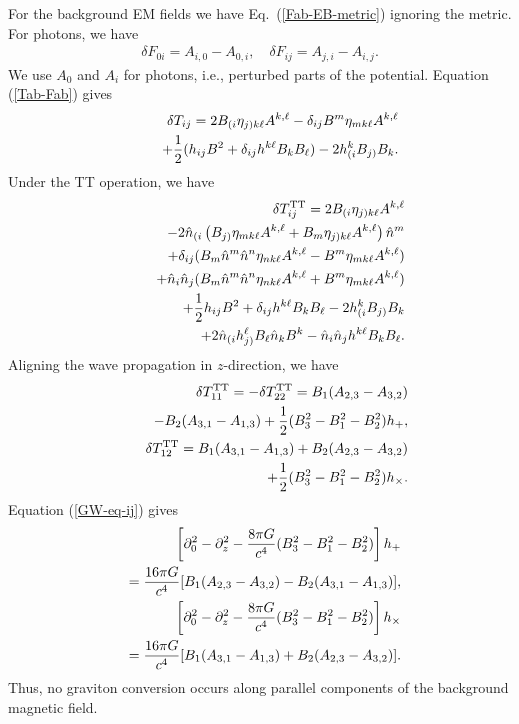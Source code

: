 \documentclass[twocolumn,amsmath,amssymb]{revtex4}
\newcommand{\bea}{\begin{eqnarray}}
\newcommand{\eea}{\end{eqnarray}}
\begin{document}
For the background EM fields we have Eq.\ (\ref{Fab-EB-metric}) ignoring the metric. For photons, we have
\bea
   \delta F_{0i} = A_{i,0} - A_{0,i}, \quad
       \delta F_{ij} = A_{j,i} - A_{i,j}.
   \label{Fab-EB-no-metric}
\eea
We use $A_0$ and $A_i$ for photons, i.e., perturbed parts of the potential. Equation (\ref{Tab-Fab}) gives
\bea
   & & \delta T_{ij} = 2 B_{(i} \eta_{j)k\ell} A^{k,\ell}
       - \delta_{ij} B^m \eta_{mk\ell} A^{k,\ell}
   \nonumber \\
   & & \qquad
       + {1 \over 2} ( h_{ij} B^2
       + \delta_{ij} h^{k\ell} B_k B_\ell )
       - 2 h^k_{(i} B_{j)} B_k.
\eea
Under the TT operation, we have
\bea
   & & \delta T_{ij}^{\rm TT}
       = 2 B_{(i} \eta_{j)k\ell} A^{k,\ell}
   \nonumber \\
   & & \qquad
       - 2 \hat n_{(i} \left( B_{j)} \eta_{mk\ell} A^{k,\ell}
       + B_m \eta_{j)k\ell} A^{k,\ell} \right) \hat n^m
   \nonumber \\
   & & \qquad
       + \delta_{ij}
       (B_m \hat n^m \hat n^n \eta_{nk\ell} A^{k,\ell}
       - B^m \eta_{mk\ell} A^{k,\ell} )
   \nonumber \\
   & & \qquad
       + \hat n_i \hat n_j
       (B_m \hat n^m \hat n^n \eta_{nk\ell} A^{k,\ell}
       + B^m \eta_{mk\ell} A^{k,\ell} )
   \nonumber \\
   & & \qquad
       + {1 \over 2} h_{ij} B^2
       + \delta_{ij} h^{k\ell} B_k B_\ell
       - 2 h^k_{(i} B_{j)} B_k
   \nonumber \\
   & & \qquad
       + 2 \hat n_{(i} h^\ell_{j)} B_\ell \hat n_k B^k
       - \hat n_i \hat n_j h^{k\ell} B_k B_\ell.
\eea
Aligning the wave propagation in $z$-direction, we have
\bea
   & & \delta T_{11}^{\rm TT}
       = - \delta T_{22}^{\rm TT}
       = B_1 ( A_{2,3} - A_{3,2} )
   \nonumber \\
   & & \qquad
       - B_2 ( A_{3,1} - A_{1,3} )
       + {1 \over 2} ( B_3^2 - B_1^2 - B_2^2 ) h_+,
   \nonumber \\
   & & \delta T_{12}^{\rm TT}
       = B_1 ( A_{3,1} - A_{1,3} )
       + B_2 ( A_{2,3} - A_{3,2} )
   \nonumber \\
   & & \qquad
       + {1 \over 2} ( B_3^2 - B_1^2 - B_2^2 ) h_\times.
\eea
Equation (\ref{GW-eq-ij}) gives
\bea
   & & \hskip -.8cm
       \left[ \partial_0^2 - \partial_z^2
       - {8 \pi G \over c^4} ( B_3^2 - B_1^2 - B_2^2 )
       \right] h_{+}
   \nonumber \\
   & & \hskip -.8cm
       \qquad
       = {16 \pi G \over c^4} [ B_1 ( A_{2,3} - A_{3,2} )
       - B_2 ( A_{3,1} - A_{1,3} ) ],
   \label{GW-A-1} \\
   & & \hskip -.8cm
       \left[ \partial_0^2 - \partial_z^2
       - {8 \pi G \over c^4} ( B_3^2 - B_1^2 - B_2^2 )
       \right] h_{\times}
   \nonumber \\
   & & \hskip -.8cm
       \qquad
       = {16 \pi G \over c^4} [ B_1 ( A_{3,1} - A_{1,3} )
       + B_2 ( A_{2,3} - A_{3,2} ) ].
   \label{GW-A-2}
\eea
Thus, no graviton conversion occurs along parallel components of the background magnetic field.
\end{document}
